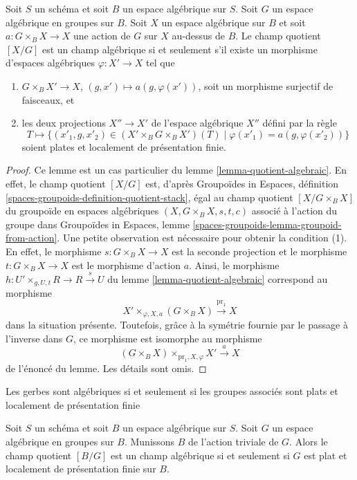 \begin{lemma}
\label{lemma-group-quotient-algebraic}
Soit $S$ un schéma et soit $B$ un espace algébrique sur $S$.
Soit $G$ un espace algébrique en groupes sur $B$.
Soit $X$ un espace algébrique sur $B$ et soit $a : G \times_B X \to X$
une action de $G$ sur $X$ au-dessus de $B$.
Le champ quotient $[X/G]$ est un champ algébrique si et seulement s'il
existe un morphisme d'espaces algébriques $\varphi : X' \to X$ tel que
\begin{enumerate}
\item $G \times_B X' \to X$, $(g, x') \mapsto a(g, \varphi(x'))$, soit un
morphisme surjectif de faisceaux, et
\item les deux projections $X'' \to X'$ de l'espace algébrique $X''$
défini par la règle
$$
T \longmapsto \{(x'_1, g, x'_2) \in (X' \times_B G \times_B X')(T)
\mid \varphi(x'_1) = a(g, \varphi(x'_2))\}
$$
soient plates et localement de présentation finie.
\end{enumerate}
\end{lemma}

\begin{proof}
Ce lemme est un cas particulier du
lemme \ref{lemma-quotient-algebraic}.
En effet, le champ quotient $[X/G]$ est, d'après
Groupoïdes in Espaces, définition \ref{spaces-groupoids-definition-quotient-stack},
égal au champ quotient $[X/G \times_B X]$ du groupoïde
en espaces algébriques $(X, G \times_B X, s, t, c)$ associé à
l'action du groupe dans
Groupoïdes in Espaces, lemme \ref{spaces-groupoids-lemma-groupoid-from-action}.
Une petite observation est nécessaire pour obtenir la condition (1).
En effet, le morphisme $s : G \times_B X \to X$ est la seconde projection
et le morphisme $t :  G \times_B X \to X$ est le morphisme d'action $a$.
Ainsi, le morphisme $h : U' \times_{g, U, t} R \to R \xrightarrow{s} U$ du
lemme \ref{lemma-quotient-algebraic}
correspond au morphisme
$$
X' \times_{\varphi, X, a} (G \times_B X) \xrightarrow{\text{pr}_1} X
$$
dans la situation présente. Toutefois, grâce à la symétrie fournie par
le passage à l'inverse dans $G$, ce morphisme est isomorphe au morphisme
$$
(G \times_B X) \times_{\text{pr}_1, X, \varphi} X' \xrightarrow{a} X
$$
de l'énoncé du lemme. Les détails sont omis.
\end{proof}

\begin{lemma}
\label{lemma-BG-algebraic}
\begin{slogan}
Les gerbes sont algébriques si et seulement si les groupes associés sont plats
et localement de présentation finie
\end{slogan}
Soit $S$ un schéma et soit $B$ un espace algébrique sur $S$.
Soit $G$ un espace algébrique en groupes sur $B$.
Munissons $B$ de l'action triviale de $G$.
Alors le champ quotient $[B/G]$ est un champ algébrique
si et seulement si $G$ est plat et localement de présentation finie sur $B$.
\end{lemma}

